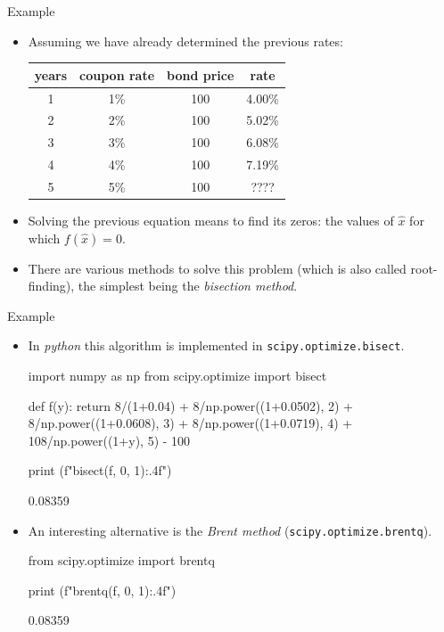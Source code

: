 \documentclass{beamer}
\begin{document}
 \begin{frame}[fragile]{Example}
 \begin{itemize}
 \item Assuming we have already determined the previous rates:
 \begin{center}
 \begin{tabular}{|c|c|c|c|}
 \hline
  years & coupon rate & bond price & rate \\
 \hline
 1 & 1\% & 100 & 4.00\% \\
 \hline
 2 & 2\% & 100 & 5.02\% \\
 \hline
 3 & 3\% & 100 & 6.08\% \\
 \hline
 4 & 4\% & 100 & 7.19\% \\
 \hline
 5 & 5\% & 100 & ???? \\
 \hline
 \end{tabular}
 \end{center}
 \item Solving the previous equation means to find its zeros: the values of $\hat{x}$ for which $f(\hat{x})=0$.
 \item There are various methods to solve this problem (which is also called root-finding), the simplest being the \emph{bisection method}.
 \end{itemize}
 \end{frame} 
 
\begin{frame}[fragile]{Example}
\begin{itemize}
 \item In \emph{python} this algorithm is implemented in \texttt{scipy.optimize.bisect}.
 
\begin{ipython}
import numpy as np
from scipy.optimize import bisect
 
def f(y):
    return 8/(1+0.04) + 8/np.power((1+0.0502), 2) + 8/np.power((1+0.0608), 3) + 
    8/np.power((1+0.0719), 4) + 108/np.power((1+y), 5) - 100
 
print (f"{bisect(f, 0, 1):.4f}")
\end{ipython}
\begin{ioutput} 
 0.08359
\end{ioutput} 
\item An interesting alternative is the \emph{Brent method} (\texttt{scipy.optimize.brentq}).

\begin{ipython}
from scipy.optimize import brentq
 
print (f"{brentq(f, 0, 1):.4f}")
\end{ipython}
\begin{ioutput} 
 0.08359
\end{ioutput} 
 \end{itemize}
 \end{frame} 
 
\end{document}

